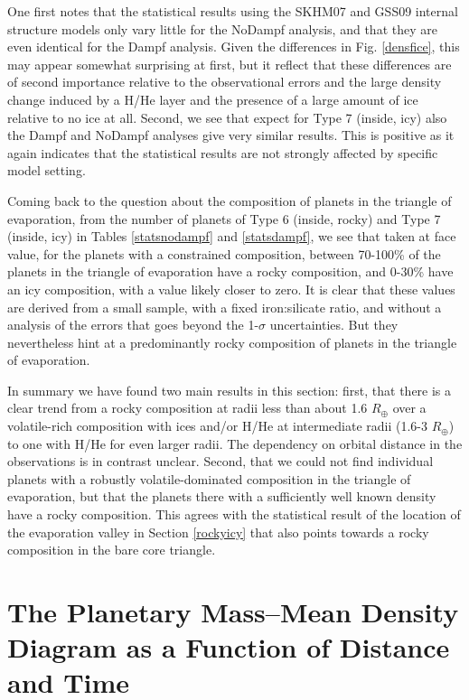 \documentclass[]{emulateapj}
\def\rearth{R_{\oplus}}
\begin{document}
One first notes that the statistical results using the SKHM07 and GSS09 internal structure models only vary little for the NoDampf analysis, and that they are even identical for the Dampf analysis. Given the differences in Fig. \ref{densfice}, this may appear somewhat surprising at first, but it reflect that these differences are of second importance relative to the observational errors and the large density change induced by a H/He layer and the presence of a large amount of ice relative to no ice at all. Second, we see that expect for Type 7 (inside, icy) also the Dampf and NoDampf analyses give very similar results. This is positive as it again indicates that the statistical results are not strongly affected by specific model setting.

Coming back to the question about the composition of planets in the triangle of evaporation, from the number of planets of Type 6 (inside, rocky) and Type 7 (inside, icy) in Tables \ref{statsnodampf} and \ref{statsdampf}, we see that taken at face value, for the planets with a constrained composition, between 70-100\% of the planets in the triangle of evaporation have a rocky composition, and 0-30\% have an icy composition, with a value likely closer to zero. It is clear that these values are derived from a small sample, with a fixed iron:silicate ratio, and without a analysis of the errors that goes beyond the 1-$\sigma$ uncertainties. But they nevertheless hint at a  predominantly rocky composition of planets in the triangle of evaporation.  

In summary we have found two main results in this section: first, that there is a clear trend from a rocky composition at radii less than about 1.6 $\rearth$ over a volatile-rich composition with ices and/or H/He at intermediate radii (1.6-3 $\rearth$) to one with H/He for even larger radii. The dependency on orbital distance in the observations is in contrast unclear. Second, that we could not find individual planets with a robustly volatile-dominated composition in the triangle of evaporation, but that the planets there with a sufficiently well known density have a rocky composition. This agrees with the statistical result of the location of the evaporation valley in Section \ref{rockyicy} that also points towards a rocky composition in the bare core triangle. 

\section{The Planetary Mass--Mean Density Diagram as a Function of Distance and Time}\label{massdensity}
  
\end{document}
